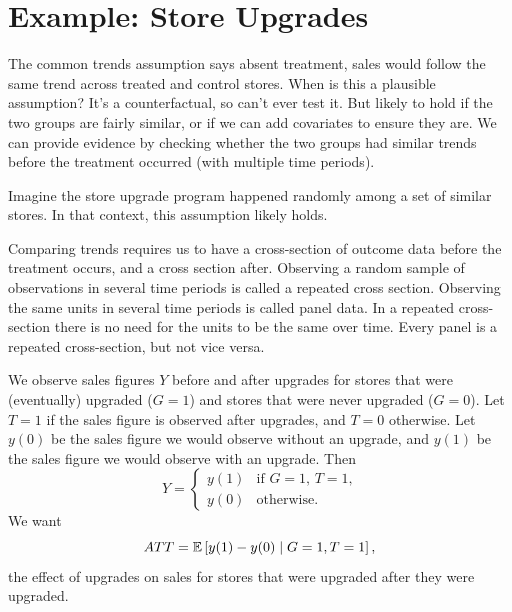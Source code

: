 
\section{Example: Store Upgrades}

\begin{remark}	The common trends assumption says absent treatment, sales would follow the same trend across treated and control stores. When is this a plausible assumption? It's a counterfactual, so can't ever test it. But likely to hold if the two groups are fairly similar, or if we can add covariates to ensure they are. We can provide evidence by checking whether the two groups had similar trends before the treatment occurred (with multiple time periods).

	Imagine the store upgrade program happened randomly among a set of similar stores. In that context, this assumption likely holds.
\end{remark}

\begin{remark}
	Comparing trends requires us to have a cross-section of outcome data before the treatment occurs, and a cross section after. Observing a random sample of observations in several time periods is called a repeated cross section. Observing the same units in several time periods is called panel data. In a repeated cross-section there is no need for the units to be the same over time. Every panel is a repeated cross-section, but not vice versa.
\end{remark}

\begin{example}
	We observe sales figures $Y$ before and after upgrades for stores that were (eventually) upgraded ($G=1$) and stores that were never upgraded ($G=0$). Let $T=1$ if the sales figure is observed after upgrades, and $T=0$ otherwise. Let $y(0)$ be the sales figure we would observe without an upgrade, and $y(1)$ be the sales figure we would observe with an upgrade. Then
	\[
		Y =
		\begin{cases}
			y(1) & \text{if $G=1$, $T=1$,} \\
			y(0) & \text{otherwise.}
		\end{cases}
	\]
	We want 
	\[
		ATT = \mathbb{E}\left[y(1)-y(0) \mid G=1, T=1\right]
	,\]
	the effect of upgrades on sales for stores that were upgraded after they were upgraded.
\end{example}

